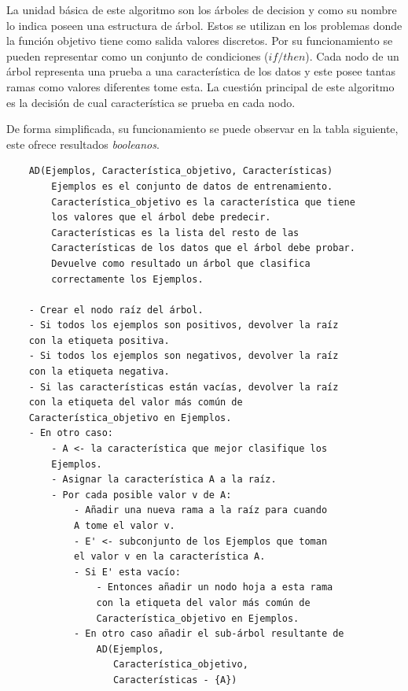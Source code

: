 La unidad básica de este algoritmo son los árboles de decision y como su nombre lo indica poseen una estructura de árbol. Estos se utilizan en los problemas donde la función objetivo tiene como salida valores discretos. Por su funcionamiento se pueden representar como un conjunto de condiciones ($if/then$). Cada nodo de un árbol representa una prueba a una característica de los datos y este posee tantas ramas como valores diferentes tome esta. La cuestión principal de este algoritmo es la decisión de cual característica se prueba en cada nodo.

De forma simplificada, su funcionamiento se puede observar en la tabla siguiente, este ofrece resultados \textit{booleanos}.

\begin{verbatim}
    AD(Ejemplos, Característica_objetivo, Características)
        Ejemplos es el conjunto de datos de entrenamiento.
        Característica_objetivo es la característica que tiene
        los valores que el árbol debe predecir.
        Características es la lista del resto de las
        Características de los datos que el árbol debe probar.
        Devuelve como resultado un árbol que clasifica
        correctamente los Ejemplos.

    - Crear el nodo raíz del árbol.
    - Si todos los ejemplos son positivos, devolver la raíz
    con la etiqueta positiva.
    - Si todos los ejemplos son negativos, devolver la raíz
    con la etiqueta negativa.
    - Si las características están vacías, devolver la raíz
    con la etiqueta del valor más común de
    Característica_objetivo en Ejemplos.
    - En otro caso:
        - A <- la característica que mejor clasifique los
        Ejemplos.
        - Asignar la característica A a la raíz.
        - Por cada posible valor v de A:
            - Añadir una nueva rama a la raíz para cuando
            A tome el valor v.
            - E' <- subconjunto de los Ejemplos que toman
            el valor v en la característica A.
            - Si E' esta vacío:
                - Entonces añadir un nodo hoja a esta rama
                con la etiqueta del valor más común de
                Característica_objetivo en Ejemplos.
            - En otro caso añadir el sub-árbol resultante de
                AD(Ejemplos, 
                   Característica_objetivo, 
                   Características - {A})
\end{verbatim}

